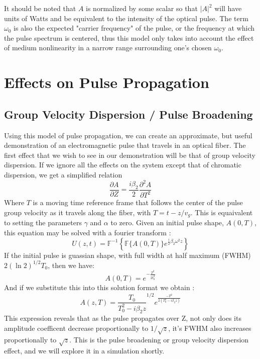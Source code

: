 \documentclass[10pt, a4paper, twocolumn]{article} %
\begin{document}
It should be noted that $A$ is normalized by some scalar so that $|A|^2$ will have units of Watts and be equivalent to the intensity of the optical pulse. The term $\omega_0$ is also the expected "carrier frequency" of the pulse, or the frequency at which the pulse spectrum is centered, thus this model only takes into account the effect of medium nonlinearity in a narrow range surrounding one's chosen $\omega_0$.

\section{Effects on Pulse Propagation}

\subsection{Group Velocity Dispersion / Pulse Broadening}
Using this model of pulse propagation, we can create an approximate, but useful demonstration of an electromagnetic pulse that travels in an optical fiber. The first effect that we wish to see in our demonstration will be that of group velocity dispersion. If we ignore all the effects on the system except that of chromatic dispersion, we get a simplified relation
$$\frac{\partial A}{\partial Z} = \frac{i\beta_2}{2} \frac{\partial^2 A}{\partial T^2}$$
Where $T$ is a moving time reference frame that follows the center of the pulse group velocity as it travels along the fiber, with $T = t - z/v_g$. This is equaivalent to setting the parameters $\gamma$ and $\alpha$ to zero. Given an initial pulse shape, $A(0, T)$, this equation may be solved with a fourier transform \cite{AgrawalChap3}:
$$U(z, t) = \mathbb{F}^{-1} \left\{ \mathbb{F} \{A(0, T)\} e^{\frac{i}{2} \beta_2 \omega^2 z} \right\}$$
If the initial pulse is guassian shape, with full width at half maximum (FWHM) $2(\ln 2 )^{1/2} T_0$, then we have:
$$A(0, T) = e^{-\frac{T^2}{2t_0^2}}$$
And if we substitute this into this solution format we obtain \cite{AgrawalChap3}: 
$$A(z, T) = \frac{T_0}{T_0^2 - i\beta_2 z}^{1/2} e^{\frac{-T^2}{2(T_0^2 - i \beta_2 z)}}$$
This expression reveals that as the pulse propagates over Z, not only does its amplitude coefficent decrease proportionally to $1/\sqrt{z}$, it's FWHM also increases proportionally to $\sqrt{z}$. This is the pulse broadening or group velocity dispersion effect, and we will explore it in a simulation shortly.
\end{document}
